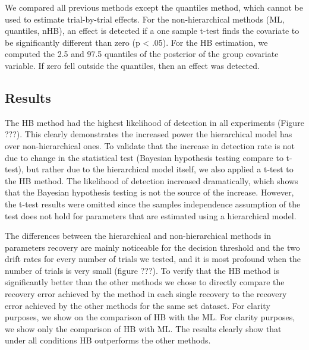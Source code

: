 \documentclass[letterpaper,10pt,english]{article}
\begin{document}
We compared all previous methods except the quantiles method, which cannot be used to estimate trial-by-trial effects. For the non-hierarchical methods (ML, quantiles, nHB), an effect is detected if a one sample t-test finds the covariate to be significantly different than zero (p < .05). For the HB estimation, we computed the 2.5 and 97.5 quantiles of the posterior of the group covariate variable. If zero fell outside the quantiles, then an effect was detected.


\subsection*{Results}
The HB method had the highest likelihood of detection in all experiments (Figure ???). This clearly demonstrates the increased power the hierarchical model has over non-hierarchical ones. To validate that the increase in detection rate is not due to change in the statistical test (Bayesian hypothesis testing compare to t-test), but rather due to the hierarchical model itself, we also applied a t-test to the HB method. The likelihood of detection increased dramatically, which shows that the Bayesian hypothesis testing is not the source of the increase. However, the t-test results were omitted since the samples independence assumption of the test does not hold for parameters that are estimated using a hierarchical model.

The differences between the hierarchical and non-hierarchical methods in parameters recovery are mainly noticeable for the decision threshold and the two drift rates for every number of trials we tested, and it is most profound when the number of trials is very small (figure ???). To verify that the HB method is significantly better than the other methods we chose to directly compare the recovery error achieved by the method in each single recovery to the recovery error achieved by the other methods for the same set dataset. For clarity purposes, we show on the comparison of HB with the ML. For clarity purposes, we show only the comparison of HB with ML. The results clearly show that under all conditions HB outperforms the other methods.
\end{document}
